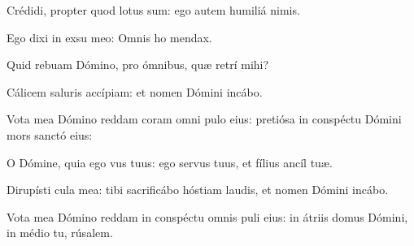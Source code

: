 \item Crédidi, propter quod lotus sum:\psstar{} ego autem humiliá  nimis.

\item Ego dixi in exsu meo:\psstar{} Omnis ho mendax.

\item Quid rebuam Dómino,\psstar{} pro ómnibus, quæ retrí mihi?

\item Cálicem saluris accípiam:\psstar{} et nomen Dómini incábo.

\item Vota mea Dómino reddam coram omni pulo eius:\psstar{} pretiósa in conspéctu Dómini mors sanctó eius:

\item O Dómine, quia ego vus tuus:\psstar{} ego servus tuus, et fílius ancíl tuæ.

\item Dirupísti cula mea:\psstar{} tibi sacrificábo hóstiam laudis, et nomen Dómini incábo.

\item Vota mea Dómino reddam in conspéctu omnis puli eius:\psstar{} in átriis domus Dómini, in médio tu, rúsalem.
